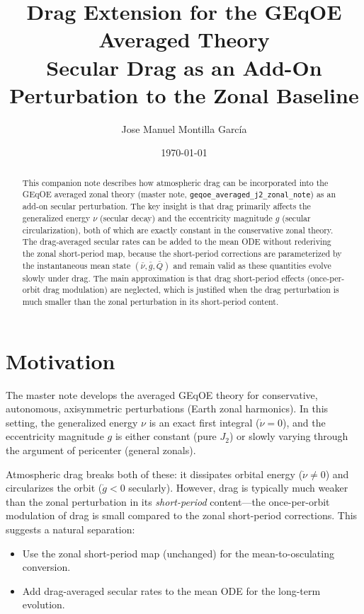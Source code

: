 \documentclass[11pt]{article}
\title{Drag Extension for the GEqOE Averaged Theory\\
\large Secular Drag as an Add-On Perturbation to the Zonal Baseline}
\author{Jose Manuel Montilla Garc\'ia}
\date{\today}
\newcommand{\master}{geqoe\_averaged\_j2\_zonal\_note}
\begin{document}
\maketitle

\begin{abstract}
This companion note describes how atmospheric drag can be incorporated into
the GEqOE averaged zonal theory (master note, \texttt{\master{}}) as an
add-on secular perturbation. The key insight is that drag primarily affects
the generalized energy $\nu$ (secular decay) and the eccentricity magnitude
$g$ (secular circularization), both of which are exactly constant in the
conservative zonal theory. The drag-averaged secular rates can be added to
the mean ODE without rederiving the zonal short-period map, because the
short-period corrections are parameterized by the instantaneous mean state
$(\bar\nu, \bar g, \bar Q)$ and remain valid as these quantities evolve
slowly under drag. The main approximation is that drag short-period effects
(once-per-orbit drag modulation) are neglected, which is justified when the
drag perturbation is much smaller than the zonal perturbation in its
short-period content.
\end{abstract}

\tableofcontents

\section{Motivation}

The master note develops the averaged GEqOE theory for conservative,
autonomous, axisymmetric perturbations (Earth zonal harmonics). In this
setting, the generalized energy $\nu$ is an exact first integral
($\dot\nu = 0$), and the eccentricity magnitude $g$ is either constant
(pure $J_2$) or slowly varying through the argument of pericenter (general
zonals).

Atmospheric drag breaks both of these: it dissipates orbital energy
($\dot\nu \ne 0$) and circularizes the orbit ($\dot g < 0$ secularly).
However, drag is typically much weaker than the zonal perturbation in its
\emph{short-period} content---the once-per-orbit modulation of drag is small
compared to the zonal short-period corrections. This suggests a natural
separation:
\begin{itemize}
\item Use the zonal short-period map (unchanged) for the mean-to-osculating
conversion.
\item Add drag-averaged secular rates to the mean ODE for the long-term
evolution.
\end{itemize}
\end{document}
